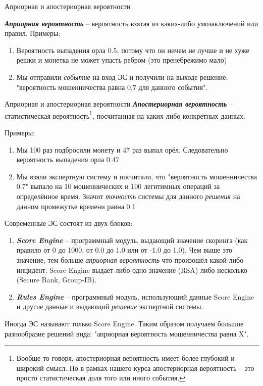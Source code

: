 \documentclass{beamer}
\newcommand{\termdef}[1]{\textbf{\textit{#1}}}
\newcommand{\term}{\textit}
\begin{document}
  \begin{frame}{Априорная и апостериорная вероятности}
  
  \termdef{Априорная вероятность} -- вероятность взятая из каких-либо умозаключений или правил.
  Примеры:
  \begin{enumerate}
  	\item Вероятность выпадения орла 0.5, потому что он ничем не лучше и не хуже решки и монетка не может упасть ребром (это пренебрежимо мало)
  	\item Мы отправили \term{событие} на вход ЭС и получили на выходе решение: "вероятность мошенничества равна 0.7 для данного события".
  \end{enumerate}
   
  \end{frame}

  \begin{frame}{Априорная и апостериорная вероятности}
\termdef{Апостериорная вероятность} -- статистическая вероятность\footnote{
	Вообще то говоря, апостериорная вероятность имеет более глубокий и широкий смысл.
	Но в рамках нашего курса апостериорная вероятность -- это просто статистическая доля того или иного события.}, посчитанная на каких-либо конкретных данных.

	Примеры: \small
	\begin{enumerate}
		\item Мы 100 раз подбросили монету и 47 раз выпал орёл. Следовательно 
		вероятность выпадения орла 0.47
		\item Мы взяли экспертную систему и посчитали, что "вероятность мошенничества 0.7"
		выпало на 10 мошеннических и 100 легитимных операций за определённое время. 
		Значит \term{точность} системы для данного \term{решения} на данном промежутке времени равна 0.1
	\end{enumerate}
\end{frame}
  
  \begin{frame}
  Современные ЭС состоят из двух блоков:
  \begin{enumerate}
  	\item \termdef{Score Engine} -- программный модуль, выдающий значение скоринга (как правило от 0 до 1000, от 0.0 до 1.0 или от -1.0 до 1.0). Чем выше это значение, тем больше
  	\textit{априорная вероятность} что произошёл какой-либо инцидент.
  	Score Engine выдает либо одно значение (RSA) 
  	либо несколько (Secure Bank, Group-IB).
  	\item \termdef{Rules Engine} -- программный модуль, использующий данные Score Engine и другие данные 
  	и выдающий \term{решение} экспертной системы.
  \end{enumerate}

  Иногда ЭС называют только Score Engine. Таким образом получаем большое разнообразие решений вида: "априорная вероятность мошенничества равна X".
  \end{frame}
  
\end{document}
